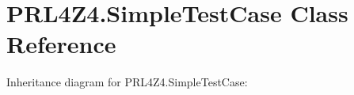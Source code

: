 \hypertarget{classPRL4Z4_1_1SimpleTestCase}{}\section{P\+R\+L4\+Z4.\+Simple\+Test\+Case Class Reference}
\label{classPRL4Z4_1_1SimpleTestCase}


Inheritance diagram for P\+R\+L4\+Z4.\+Simple\+Test\+Case\+:
